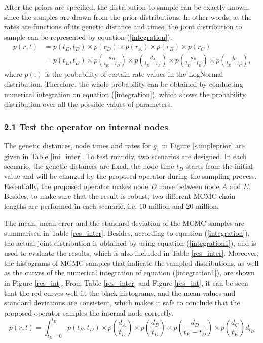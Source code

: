 \documentclass{bmcart}
\begin{document}
\begin{backmatter}
After the priors are specified, the distribution to sample can be exactly known, since the samples are drawn from the prior distributions. In other words, as the rates are functions of its genetic distance and times, the joint distribution to sample can be represented by equation (\ref{integration}).
\begin{equation}\label{integration}
\begin{aligned}
p(r,t) &= p({t_E},{t_D}) \times p({r_D}) \times p({r_A}) \times p({r_B}) \times p({r_C}) \\&= p({t_E},{t_D}) \times p(\frac{{{d_D}}}{{t_E} - {t_D}}) \times p(\frac{{{d_A}}}{{t_D} - {t_A}}) \times p(\frac{{{d_B}}}{{t_D} - {t_B}}) \times p(\frac{{{d_C}}}{{t_E} - {t_C}})\text{,}
\end{aligned}
\end{equation}
where $p({.})$ is the probability of certain rate values in the LogNormal distribution. Therefore, the whole probability can be obtained by conducting numerical integration on equation (\ref{integration}), which shows the probability distribution over all the possible values of parameters.

\subsubsection*{2.1 Test the operator on internal nodes}

The genetic distances, node times and rates for $g_1$ in Figure \ref{sampleprior} are given in Table \ref{ini_inter}. To test roundly, two scenarios are designed. In each scenario, the genetic distances are fixed, the node time $t_D$ starts from the initial value and will be changed by the proposed operator during the sampling process. Essentially, the proposed operator makes node $D$ move between node $A$ and $E$. Besides, to make sure that the result is robust, two different MCMC chain lengths are performed in each scenario, i.e. 10 million and 20 million.

The mean, mean error and the standard deviation of the MCMC samples are summarised in Table \ref{res_inter}. Besides, according to equation (\ref{integration}), the actual joint distribution is obtained by using equation (\ref{integration1}), and is used to evaluate the results, which is also included in Table \ref{res_inter}. Moreover, the histograms of MCMC samples that indicate the sampled distributions, as well as the curves of the numerical integration of equation (\ref{integration1}), are shown in Figure \ref{res_int}. From Table \ref{res_inter} and Figure \ref{res_int}, it can be seen that the red curves well fit the black histograms, and the mean values and standard deviations are consistent, which makes it safe to conclude that the proposed operator samples the internal node correctly.
\begin{equation}
\label{integration1}
p(r,t) = \int_{{t_D} = 0}^{{t_E}} {p({t_E},{t_D}) \times p(\frac{{{d_A}}}{{{t_D}}}) \times p(\frac{{{d_B}}}{{{t_D}}}) \times p(\frac{{{d_D}}}{{{t_E} - {t_D}}}) \times p(\frac{{{d_C}}}{{{t_E}}}){d_{t_D}}}
\end{equation}


\end{backmatter}
\end{document}
